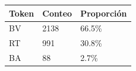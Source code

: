 \begin{tabular}{lll}
\toprule
Token & Conteo & Proporción \\
\midrule
BV & 2138 & 66.5\% \\
RT & 991 & 30.8\% \\
BA & 88 & 2.7\% \\
\bottomrule
\end{tabular}
